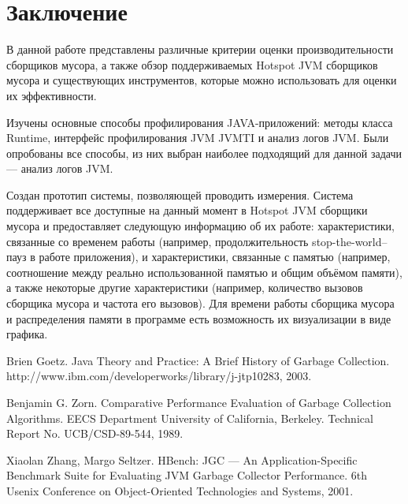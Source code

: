 \section*{Заключение}

В данной работе представлены различные критерии оценки производительности сборщиков мусора,
а также обзор поддерживаемых Hotspot JVM сборщиков мусора и существующих инструментов,
которые можно использовать для оценки их эффективности.

Изучены основные способы профилирования JAVA-приложений: методы класса Runtime, интерфейс
профилирования JVM JVMTI и анализ логов JVM. Были опробованы все способы,
из них выбран наиболее подходящий для данной задачи --- анализ логов JVM.

Создан прототип системы, позволяющей проводить измерения. Система поддерживает все доступные на данный
момент в Hotspot JVM сборщики мусора и предоставляет следующую информацию об их работе: характеристики, связанные
со временем работы (например, продолжительность stop-the-world--пауз в работе приложения), и
характеристики, связанные с памятью (например, соотношение между реально использованной 
памятью и общим объёмом памяти), а также некоторые другие характеристики (например,
количество вызовов сборщика мусора и частота его вызовов). Для времени работы сборщика 
мусора и распределения памяти в программе есть возможность их визуализации в виде
графика.

\begin{thebibliography}{99}
Brien Goetz. Java Theory and Practice: A Brief History of Garbage Collection.
http://www.ibm.com/developerworks/library/j-jtp10283, 2003.

Benjamin G. Zorn.
Comparative Performance Evaluation of Garbage Collection Algorithms. EECS Department University of California, Berkeley.
Technical Report No. UCB/CSD-89-544, 1989.

Xiaolan Zhang, Margo Seltzer.
HBench: JGC --- An Application-Specific Benchmark Suite for Evaluating JVM Garbage Collector Performance. 6th Usenix Conference
on Object-Oriented Technologies and Systems, 2001.
\end{thebibliography}
